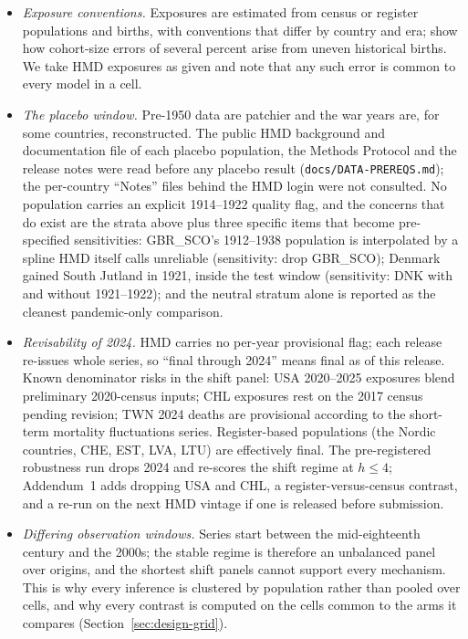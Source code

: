 \begin{itemize}
\item \emph{Exposure conventions.} Exposures are estimated from census or
  register populations and births, with conventions that differ by country
  and era; \citet{cairns2016phantoms} show how cohort-size errors of several
  percent arise from uneven historical births. We take HMD exposures as
  given and note that any such error is common to every model in a cell.
\item \emph{The placebo window.} Pre-1950 data are patchier and the war years
  are, for some countries, reconstructed. The public HMD background and
  documentation file of each placebo population, the Methods Protocol and
  the release notes were read before any placebo result
  (\texttt{docs/DATA-PREREQS.md}); the per-country ``Notes'' files behind
  the HMD login were not consulted. No population carries an explicit
  1914--1922 quality flag, and the concerns that do exist are the strata
  above plus three specific items that become pre-specified sensitivities:
  GBR\_SCO's 1912--1938 population is interpolated by a spline HMD itself
  calls unreliable (sensitivity: drop GBR\_SCO); Denmark gained South Jutland
  in 1921, inside the test window (sensitivity: DNK with and without
  1921--1922); and the neutral stratum alone is reported as the cleanest
  pandemic-only comparison.
\item \emph{Revisability of 2024.} HMD carries no per-year provisional flag;
  each release re-issues whole series, so ``final through 2024'' means final
  as of this release. Known denominator risks in the shift panel: USA
  2020--2025 exposures blend preliminary 2020-census inputs; CHL exposures
  rest on the 2017 census pending revision; TWN 2024 deaths are provisional
  according to the short-term mortality fluctuations series. Register-based
  populations (the Nordic countries, CHE, EST, LVA, LTU) are effectively
  final. The pre-registered robustness run drops 2024 and re-scores the shift
  regime at $h\le4$; Addendum~1 adds dropping USA and CHL, a
  register-versus-census contrast, and a re-run on the next HMD vintage if
  one is released before submission.
\item \emph{Differing observation windows.} Series start between the
  mid-eighteenth century and the 2000s; the stable regime is therefore an
  unbalanced panel over origins, and the shortest shift panels cannot
  support every mechanism. This is why every inference is clustered by
  population rather than pooled over cells, and why every contrast is
  computed on the cells common to the arms it compares
  (Section~\ref{sec:design-grid}).
\end{itemize}

